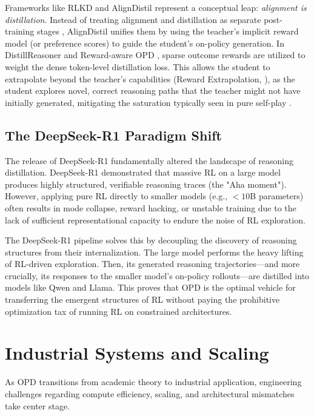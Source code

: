 Frameworks like RLKD \citep{arxiv_2505_16142} and AlignDistil \citep{arxiv_2503_02832} represent a conceptual leap: \textit{alignment is distillation}. Instead of treating alignment and distillation as separate post-training stages \citep{arxiv_2312_01552}, AlignDistil unifies them by using the teacher's implicit reward model (or preference scores) to guide the student's on-policy generation. In DistillReasoner \citep{arxiv_2408_06037} and Reward-aware OPD \citep{arxiv_2503_04711}, sparse outcome rewards are utilized to weight the dense token-level distillation loss. This allows the student to extrapolate beyond the teacher's capabilities (Reward Extrapolation, \citealp{arxiv_2602_12125}), as the student explores novel, correct reasoning paths that the teacher might not have initially generated, mitigating the saturation typically seen in pure self-play \citep{arxiv_2411_04109}.

\subsection{The DeepSeek-R1 Paradigm Shift}
The release of DeepSeek-R1 \citep{arxiv_2501_12948} fundamentally altered the landscape of reasoning distillation. DeepSeek-R1 demonstrated that massive RL on a large model produces highly structured, verifiable reasoning traces (the "Aha moment"). However, applying pure RL directly to smaller models (e.g., $<10$B parameters) often results in mode collapse, reward hacking, or unstable training due to the lack of sufficient representational capacity to endure the noise of RL exploration.

The DeepSeek-R1 pipeline solves this by decoupling the discovery of reasoning structures from their internalization. The large model performs the heavy lifting of RL-driven exploration. Then, its generated reasoning trajectories—and more crucially, its responses to the smaller model's on-policy rollouts—are distilled into models like Qwen and Llama. This proves that OPD is the optimal vehicle for transferring the emergent structures of RL without paying the prohibitive optimization tax of running RL on constrained architectures.

\section{Industrial Systems and Scaling}
\label{sec:systems}

As OPD transitions from academic theory to industrial application, engineering challenges regarding compute efficiency, scaling, and architectural mismatches take center stage. 

